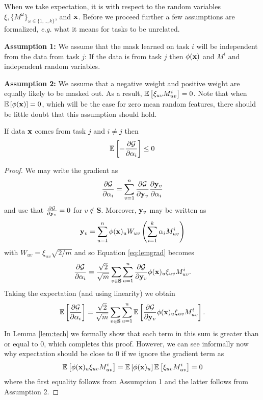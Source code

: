 \documentclass{article}
\begin{document}
When we take expectation, it is with respect to the random variables $\xi, \{M^\omega\}_{\omega \in \{1,..,k\}}$, and $\mathbf{x}$. Before we proceed further a few assumptions are formalized, \textit{e.g.} what it means for tasks to be unrelated.

\textbf{Assumption 1:} We assume that the mask learned on task $i$ will be independent from the data from task $j$: If the data is from task $j$ then $\phi(\mathbf{x})$ and $M^i$ and independent random variables.

\textbf{Assumption 2:} We assume that a negative weight and positive weight are equally likely to be masked out. As a result, $\mathbb{E}\left\lbrack \xi_{uv}M_{uv}^i \right\rbrack = 0$. Note that when $\mathbb{E}\left\lbrack \phi(\mathbf{x}) \right\rbrack = 0$, which will be the case for zero mean random features, there should be little doubt that this assumption should hold.

\begin{lemma}
If data $\mathbf{x}$ comes from task $j$ and $i \neq j$ then
\begin{align}
    \mathbb{E}\left\lbrack -\frac{\partial \mathcal{G}}{\partial \alpha_i}  \right\rbrack \leq 0
\end{align}
\begin{proof}
We may write the gradient as
\begin{align} \label{eq:lemgrad}
    \frac{\partial \mathcal{G}}{\partial \alpha_i} = \sum_{v=1}^n \frac{\partial \mathcal{G}}{\partial \mathbf{y}_v} \frac{\partial \mathbf{y}_v}{\partial \alpha_i} 
\end{align}
and use that $\frac{\partial \mathcal{G}}{\partial \mathbf{y}_v} = 0$ for $v \not \in \mathbf{S}$. Moreover, $\mathbf{y}_v$ may be written as
\begin{align}
    \mathbf{y}_v = \sum_{u = 1}^n \phi(\mathbf{x})_u W_{uv} \left( \sum_{i=1}^k \alpha_i M^i_{uv} \right)
\end{align}
with $W_{uv} = \xi_{uv} \sqrt{2 / m}$ and so Equation \ref{eq:lemgrad} becomes
\begin{align}
    \frac{\partial \mathcal{G}}{\partial \alpha_i} = \frac{\sqrt 2}{\sqrt m} \sum_{v \in \mathbf{S}}  \sum_{u = 1}^n   \frac{\partial \mathcal{G}}{\partial \mathbf{y}_v} \phi(\mathbf{x})_u   \xi_{uv} M_{uv}^i.
\end{align}
Taking the expectation (and using linearity) we obtain
\begin{align} \label{eq:grad-simple}
    \mathbb{E}\left\lbrack \frac{\partial \mathcal{G}}{\partial \alpha_i} \right\rbrack = \frac{\sqrt 2}{\sqrt m} \sum_{v \in \mathbf{S}}  \sum_{u = 1}^n   \mathbb{E}\left\lbrack  \frac{\partial \mathcal{G}}{\partial \mathbf{y}_v} \phi(\mathbf{x})_u   \xi_{uv} M_{uv}^i  \right\rbrack.
\end{align}
In Lemma \ref{lem:tech} we formally show that each term in this sum is greater than or equal to 0, which completes this proof. However, we can see informally now why expectation should be close to 0 if we ignore the gradient term as
\begin{align}
   \mathbb{E}\left\lbrack  \phi(\mathbf{x})_u   \xi_{uv} M_{uv}^i  \right\rbrack = \mathbb{E}\left\lbrack  \phi(\mathbf{x})_u   \right\rbrack \mathbb{E}\left\lbrack  \xi_{uv} M_{uv}^i  \right\rbrack = 0
\end{align}
where the first equality follows from Assumption 1 and the latter follows from Assumption 2.
\end{proof}
\end{lemma}
\end{document}
